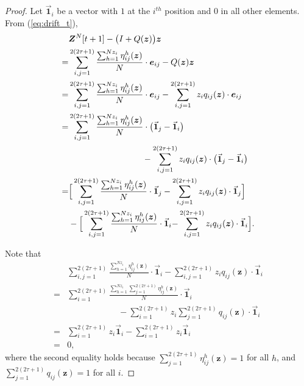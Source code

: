 \documentclass[11pt,twocolumn]{IEEEtran}
\begin{document}
\begin{proof}
Let $\vec{\bm 1}_i$ be a vector with $1$ at the $i^{th}$ position and $0$ in all other elements. From (\ref{eq:drift_t}),
\begin{align}
&\bm Z^{N}[t+1]-\big(I+Q(\bm z)\big)\bm z \nonumber \\
=& \sum_{i,j=1}^{2(2\tau+1)} \frac{\sum_{h=1}^{N z_i} \eta^h_{ij}(\bm z)}{N} \cdot \bm e_{ij}- Q(\bm z)\bm z \nonumber \\
=& \sum_{i,j=1}^{2(2\tau+1)} \frac{\sum_{h=1}^{N z_i} \eta^h_{ij}(\bm z)}{N} \cdot \bm e_{ij}- \sum_{i,j=1}^{2(2\tau+1)}z_i q_{ij}(\bm z)\cdot \bm e_{ij} \nonumber \\
=& \sum_{i,j=1}^{2(2\tau+1)} \frac{\sum_{h=1}^{N z_i} \eta^h_{ij}(\bm z)}{N} \cdot \big(\vec{\bm 1}_{j}-\vec{\bm 1}_{i}\big)\nonumber\\
&\hspace{1.2in} - \sum_{i,j=1}^{2(2\tau+1)}z_i q_{ij}(\bm z)\cdot \big(\vec{\bm 1}_{j}-\vec{\bm 1}_{i}\big) \nonumber \\
=& \Big[ \sum_{i,j=1}^{2(2\tau+1)} \frac{\sum_{h=1}^{N z_i} \eta^h_{ij}(\bm z)}{N} \cdot \vec{\bm 1}_{j} - \sum_{i,j=1}^{2(2\tau+1)}z_i q_{ij}(\bm z)\cdot \vec{\bm 1}_{j}\Big]\nonumber\\
&-\Big[ \sum_{i,j=1}^{2(2\tau+1)} \frac{\sum_{h=1}^{N z_i} \eta^h_{ij}(\bm z)}{N} \cdot \vec{\bm 1}_{i} {-} \sum_{i,j=1}^{2(2\tau+1)}z_i q_{ij}(\bm z)\cdot \vec{\bm 1}_{i}\Big]. \nonumber
\end{align}

Note that
\begin{align}
&\sum_{i,j=1}^{2(2\tau+1)} \frac{\sum_{h=1}^{N z_i} \eta^h_{ij}(\bm z)}{N} {\cdot} \vec{\bm 1}_{i} {-} \sum_{i,j=1}^{2(2\tau+1)}z_i q_{ij}(\bm z){\cdot} \vec{\bm 1}_{i}\nonumber\\
{=}&\sum_{i=1}^{2(2\tau+1)} \frac{\sum_{h=1}^{N z_i} \sum_{j=1}^{2(2\tau+1)} \eta^h_{ij}(\bm z)}{N} {\cdot} \vec{\bm 1}_{i}\nonumber\\
&\hspace{1in}{-} \sum_{i=1}^{2(2\tau+1)}z_i \sum_{j=1}^{2(2\tau+1)} q_{ij}(\bm z){\cdot} \vec{\bm 1}_{i} \nonumber \\
{=}&\sum_{i=1}^{2(2\tau+1)} z_i \vec{\bm 1}_{i} -\sum_{i=1}^{2(2\tau+1)} z_i \vec{\bm 1}_{i} \nonumber \\
=&0, \nonumber
\end{align}
where the second equality holds because $\sum_{j=1}^{2(2\tau+1)} \eta^h_{ij}(\bm z)=1$ for all $h$, and $\sum_{j=1}^{2(2\tau+1)} q_{ij}(\bm z)=1$ for all $i$.


\end{proof}
\end{document}
